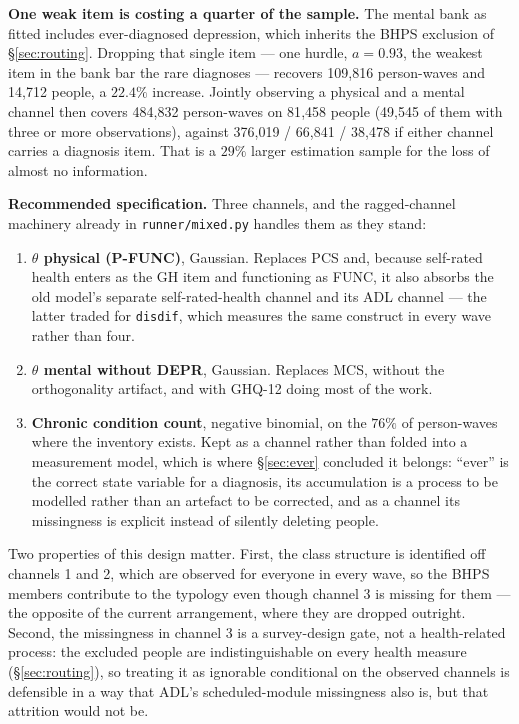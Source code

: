 \documentclass[11pt]{article}
\newcommand{\code}[1]{\texttt{\small #1}}
\begin{document}
\textbf{One weak item is costing a quarter of the sample.} The mental bank as
fitted includes ever-diagnosed depression, which inherits the BHPS exclusion
of \S\ref{sec:routing}. Dropping that single item --- one hurdle, $a =
0.93$, the weakest item in the bank bar the rare diagnoses --- recovers
109{,}816 person-waves and 14{,}712 people, a $22.4\%$ increase. Jointly
observing a physical and a mental channel then covers 484{,}832 person-waves
on 81{,}458 people (49{,}545 of them with three or more observations),
against 376{,}019 / 66{,}841 / 38{,}478 if either channel carries a
diagnosis item. That is a $29\%$ larger estimation sample for the loss of
almost no information.

\textbf{Recommended specification.} Three channels, and the ragged-channel
machinery already in \code{runner/mixed.py} handles them as they stand:

\begin{enumerate}\itemsep2pt
\item \textbf{$\theta$ physical (P-FUNC)}, Gaussian. Replaces PCS and,
because self-rated health enters as the GH item and functioning as FUNC, it
also absorbs the old model's separate self-rated-health channel and its ADL
channel --- the latter traded for \code{disdif}, which measures the same
construct in every wave rather than four.
\item \textbf{$\theta$ mental without DEPR}, Gaussian. Replaces MCS, without
the orthogonality artifact, and with GHQ-12 doing most of the work.
\item \textbf{Chronic condition count}, negative binomial, on the $76\%$ of
person-waves where the inventory exists. Kept as a channel rather than folded
into a measurement model, which is where \S\ref{sec:ever} concluded it
belongs: ``ever'' is the correct state variable for a diagnosis, its
accumulation is a process to be modelled rather than an artefact to be
corrected, and as a channel its missingness is explicit instead of silently
deleting people.
\end{enumerate}

Two properties of this design matter. First, the class structure is
identified off channels 1 and 2, which are observed for everyone in every
wave, so the BHPS members contribute to the typology even though channel 3 is
missing for them --- the opposite of the current arrangement, where they are
dropped outright. Second, the missingness in channel 3 is a survey-design
gate, not a health-related process: the excluded people are indistinguishable
on every health measure (\S\ref{sec:routing}), so treating it as ignorable
conditional on the observed channels is defensible in a way that ADL's
scheduled-module missingness also is, but that attrition would not be.
\end{document}
